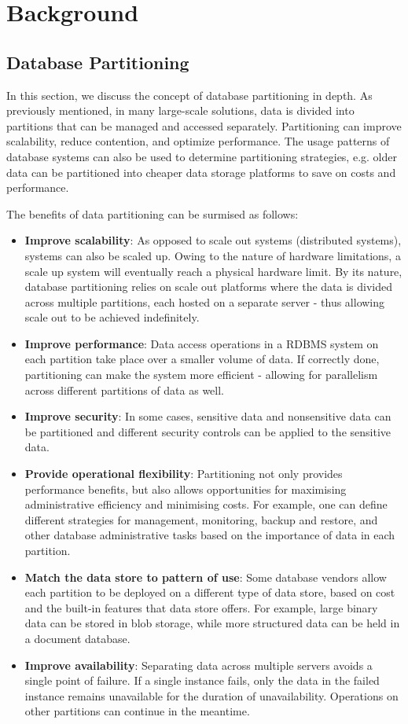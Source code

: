 \chapter{Background}

\section{Database Partitioning}
In this section, we discuss the concept of database partitioning in depth. As previously mentioned, in many large-scale solutions, data is divided into partitions that can be managed and accessed separately. Partitioning can improve scalability, reduce contention, and optimize performance. The usage patterns of database systems can also be used to determine partitioning strategies, e.g. older data can be partitioned into cheaper data storage platforms to save on costs and performance.

The benefits of data partitioning can be surmised as follows:

\begin{itemize}
\item \textbf{Improve scalability}: As opposed to scale out systems (distributed systems), systems can also be scaled up. Owing to the nature of hardware limitations, a scale up system will eventually reach a physical hardware limit. By its nature, database partitioning relies on scale out platforms where the data is divided across multiple partitions, each hosted on a separate server - thus allowing scale out to be achieved indefinitely.
\item \textbf{Improve performance}: Data access operations in a RDBMS system on each partition take place over a smaller volume of data. If correctly done, partitioning can make the system more efficient - allowing for parallelism across different partitions of data as well.
\item \textbf{Improve security}: In some cases, sensitive data and nonsensitive data can be partitioned and different security controls can be applied to the sensitive data.
\item \textbf{Provide operational flexibility}: Partitioning not only provides performance benefits, but also allows opportunities for maximising administrative efficiency and minimising costs. For example, one can define different strategies for management, monitoring, backup and restore, and other database administrative tasks based on the importance of data in each partition.
\item \textbf{Match the data store to pattern of use}: Some database vendors allow each partition to be deployed on a different type of data store, based on cost and the built-in features that data store offers. For example, large binary data can be stored in blob storage, while more structured data can be held in a document database.
\item \textbf{Improve availability}: Separating data across multiple servers avoids a single point of failure. If a single instance fails, only the data in the failed instance remains unavailable for the duration of unavailability. Operations on other partitions can continue in the meantime. 

\end{itemize}


